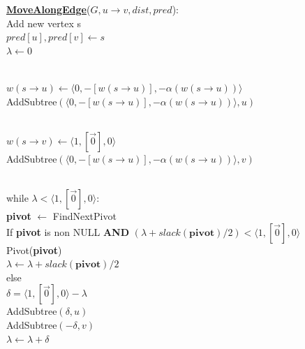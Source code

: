 \documentclass{article}
\begin{document}
\begin{algorithm}
\textbf{\underline{MoveAlongEdge}}($G, u \rightarrow v, dist, pred$): \\ \quad
Add new vertex s \\ \quad
$pred[u], pred[v] \leftarrow s$ \\ \quad
$\lambda \leftarrow 0$ \\ \\ \quad

$w(s \rightarrow u) \leftarrow \langle 0, -[w(s \rightarrow u)], 
-\alpha(w(s \rightarrow u)) \rangle$ \\ \quad
AddSubtree$(\langle 0, -[w(s \rightarrow u)], 
-\alpha(w(s \rightarrow u)) \rangle, u)$ \\ \\ \quad

$w(s \rightarrow v) \leftarrow \langle 1, [\vec{0}], 0 \rangle$ \\ \quad
AddSubtree$(\langle 0, -[w(s \rightarrow u)], 
-\alpha(w(s \rightarrow u)) \rangle, v)$ \\ \\ \quad

while $\lambda < \langle 1, [\vec{0}], 0 \rangle$: \\ \quad \quad
    \textbf{pivot} $\leftarrow $ FindNextPivot \\ \quad \quad
    If \textbf{pivot} is non NULL \textbf{AND} 
    $(\lambda + slack(\textbf{pivot}) / 2) < \langle 1, [\vec{0}], 0 \rangle$ \\ \qquad \quad
        Pivot(\textbf{pivot}) \\ \qquad \quad
        $\lambda \leftarrow \lambda + slack(\textbf{pivot}) / 2$ \\ \quad \quad
    else \\ \qquad \quad
        $\delta = \langle 1, [\vec{0}], 0 \rangle - \lambda$ \\ \qquad \quad
        AddSubtree$(\delta, u)$ \\ \qquad \quad
        AddSubtree$(-\delta, v)$ \\ \qquad \quad
        $\lambda \leftarrow \lambda + \delta$ \\
\end{algorithm}
\end{document}
